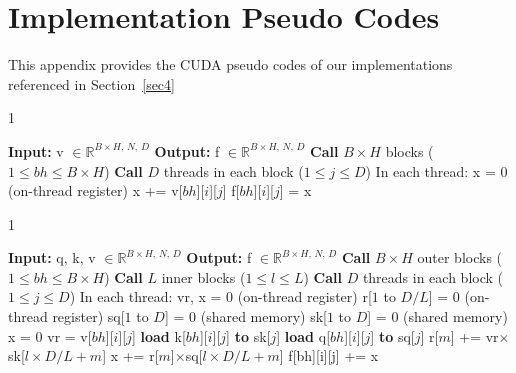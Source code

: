 \section{Implementation Pseudo Codes}
\label{app:code}
This appendix provides the CUDA pseudo codes of our implementations referenced in Section~\ref{sec4}
\begin{algorithm}
\begin{spacing}{1}
  \caption{Forward-Pass, Constant term}
  \label{alg1}
  \begin{algorithmic}[1] %
  \STATE \textbf{Input:} v $\in \mathbb{R}^{B\times H,\,N,\,D}$
  \STATE \textbf{Output:} f $\in \mathbb{R}^{B\times H,\,N,\,D}$
    \STATE \textbf{Call} $B\times H$ blocks ($1\leq bh\leq B\times H$)
    \STATE \textbf{Call} $D$ threads in each block ($1\leq j\leq D$) 
    \STATE In each thread:
    \STATE x = 0 (on-thread register)
       \STATE x += v[$bh$][$i$][$j$]
       \STATE f[$bh$][$i$][$j$] = x
    \ENDFOR
  \end{algorithmic}
  \end{spacing}
\end{algorithm}

\begin{algorithm}
\begin{spacing}{1}
  \caption{Forward-Pass, Linear term}
  \label{alg2}
  \begin{algorithmic}[1] %
    \STATE \textbf{Input:} q, k, v $\in \mathbb{R}^{B\times H,\,N,\,D}$
    \STATE \textbf{Output:} f $\in \mathbb{R}^{B\times H,\,N,\,D}$
    \STATE \textbf{Call} $B\times H$ outer blocks ($1\leq bh\leq B\times H$)
    \STATE \textbf{Call} $L$ inner blocks ($1\leq l\leq L$)
    \STATE \textbf{Call} $D$ threads in each block ($1\leq j\leq D$) 
    \STATE In each thread:
    \STATE vr, x = 0 (on-thread register)
    \STATE r[$1$ to $D/L$] = 0 (on-thread register)
    \STATE sq[$1$ to $D$] = 0 (shared memory)
    \STATE sk[$1$ to $D$] = 0 (shared memory)
        \STATE x = 0
        \STATE vr = v[$bh$][$i$][$j$]
        \STATE \textbf{load} k[$bh$][$i$][$j$] \textbf{to} sk[$j$]
        \STATE \textbf{load} q[$bh$][$i$][$j$] \textbf{to} sq[$j$]
           \STATE r[$m$] += vr$\times$sk[$l\times D/L + m$]
           \STATE x += r[$m$]$\times$sq[$l\times D/L + m$]
       \ENDFOR
       \STATE f[bh][i][j] += x
    \ENDFOR
  \end{algorithmic}
  \end{spacing}
\end{algorithm}

